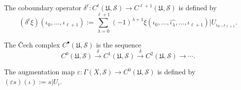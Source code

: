 The coboundary operator $\delta^{\ell}: C^{\ell}(\mathfrak{U}, \mathcal{S}) \rightarrow C^{\ell+1}(\mathfrak{U}, \mathcal{S})$ is defined by
$$(\delta^{\ell}\xi)(\iota_0, \dots, \iota_{\ell+1}) := \sum_{\lambda=0}^{\ell+1} (-1)^{\lambda+1} \xi(\iota_0, \dots, \widehat{\iota_{\lambda}}, \dots, \iota_{\ell+1}) | U_{\iota_0 \dots \iota_{\ell+1}}.$$

The Čech complex $C^{\bullet}(\mathfrak{U}, \mathcal{S})$ is the sequence
$$C^0(\mathfrak{U}, \mathcal{S}) \xrightarrow{\delta} C^1(\mathfrak{U}, \mathcal{S}) \xrightarrow{\delta} C^2(\mathfrak{U}, \mathcal{S}) \rightarrow \cdots.$$

The augmentation map $\varepsilon: \Gamma(X, \mathcal{S}) \rightarrow C^0(\mathfrak{U}, \mathcal{S})$ is defined by $(\varepsilon s)(\iota) := s|U_{\iota}.$
